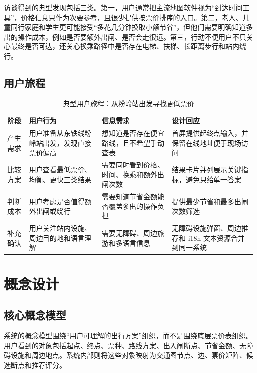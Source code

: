 \documentclass[UTF8,a4paper,11pt]{ctexart}
\begin{document}
访谈得到的典型发现包括三类。第一，用户通常把主流地图软件视为“到达时间工具”，价格信息只作为次要参考，且很少提供按票价排序的入口。第二，老人、儿童同行家庭和学生更可能接受“多花几分钟换取小额节省”，但他们需要明确知道多出的操作成本，例如是否要额外出闸、是否会走很远。第三，行动不便用户不只关心最终是否可达，还关心换乘路径中是否存在电梯、扶梯、长距离步行和站内绕行。

\subsection{用户旅程}

\begin{table}[H]
  \centering
  \caption{典型用户旅程：从粉岭站出发寻找更低票价}
  \begin{tabularx}{\textwidth}{p{}YYY}
    \toprule
    阶段 & 用户行为 & 信息需求 & 设计回应 \\
    \midrule
    产生需求 & 用户准备从东铁线粉岭站出发，发现直接票价偏高 & 想知道是否存在便宜路线，且不希望手动查表 & 首屏提供起终点输入，并保留在线地址便于现场访问 \\
    比较方案 & 用户查看最低票价、均衡、更快三类结果 & 需要同时看到价格、时间、换乘和额外出闸次数 & 结果卡片并列展示关键指标，避免只给单一答案 \\
    判断成本 & 用户考虑是否值得额外出闸或绕行 & 需要知道节省金额能否覆盖多出的操作负担 & 提供最少节省和最多出闸次数筛选 \\
    补充确认 & 用户关注站内设施、周边目的地和语言理解 & 需要无障碍、周边旅游和多语言信息 & 无障碍设施弹窗、周边推荐和 i18n 文本资源合并到同一系统 \\
    \bottomrule
  \end{tabularx}
\end{table}

\section{概念设计}

\subsection{核心概念模型}

系统的概念模型围绕“用户可理解的出行方案”组织，而不是围绕底层票价表组织。用户看到的对象包括起点、终点、票种、路线方案、出入闸断点、节省金额、无障碍设施和周边地点。系统内部则将这些对象映射为交通图节点、边、票价矩阵、候选断点和推荐评分。
\end{document}
